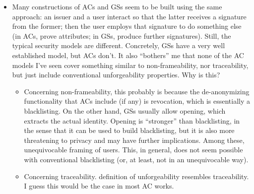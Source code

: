 \documentclass{llncs}%
\begin{document}
\begin{itemize}
\item Many constructions of ACs and GSs seem to be built using the same
  approach: an issuer and a user interact so that the latter receives a signature
  from the former; then the user employs that signature to do something else (in
  ACs, prove attributes; in GSs, produce further signatures). Still, the typical
  security models are different. Concretely, GSs have a very well established
  model, but ACs don't. It also ``bothers'' me that none of the AC models I've
  seen cover something similar to non-frameability, nor traceability, but just
  include conventional unforgeability properties. Why is this?
  \begin{itemize}
  \item Concerning non-frameability, this probably is because the de-anonymizing
    functionality that ACs include (if any) is revocation, which is essentially
    a blacklisting. On the other hand, GSs usually allow opening, which extracts
    the actual identity. Opening is ``stronger'' than blacklisting, in the sense
    that it can be used to build blacklisting, but it is also more threatening
    to privacy and may have further implications. Among these, unequivocable
    framing of users. This, in general, does not seem possible with conventional
    blacklisting (or, at least, not in an unequivocable way).
  \item Concerning traceability. \cite{fhs19} definition of unforgeability
    resembles traceability. I guess this would be the case in most AC works.
  \end{itemize}
\end{itemize}




\end{document}

